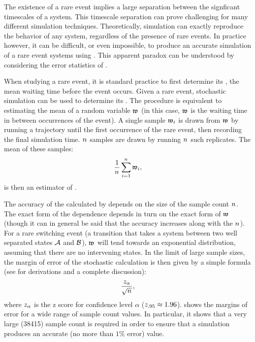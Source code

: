 The existence of a rare event implies a large separation between the signficant timescales of  a system. This timescale separation can prove challenging\cite{Shampine:1979em,Petzold:1983if} for many different simulation techniques. Theoretically,  simulation can exactly reproduce the behavior of any system, regardless of the presence of rare events. In practice however, it can be difficult, or even impossible, to produce an accurate simulation of a rare event systems using . This apparent paradox can be understood by considering the error statistics of . 


When studying a rare event, it is standard practice to first determine its , the mean waiting time before the event occurs. Given a rare event, stochastic simulation can be used to determine its . The procedure is equivalent to estimating the mean of a random variable $\mathfrak{w}_{}$ (in this case, $\mathfrak{w}_{}$ is the waiting time in between occurrences of the event). A single sample $\mathfrak{w}_{i}$ is drawn from $\mathfrak{w}_{}$ by running a trajectory until the first occurrence of the rare event, then recording the final simulation time. $n_{}$ samples are drawn by running $n_{}$ such replicates. The mean of these samples: 
\begin{equation*}
    \frac{1}{n_{}} \sum_{i=1}^{n_{}} \mathfrak{w}_{i}, 
\end{equation*}
is then an estimator of .

The accuracy of the  calculated by  depends on the size of the sample count $n_{}$. The exact form of the dependence depends in turn on the exact form of $\mathfrak{w}_{}$ (though it can in general be said that the accuracy increases along with the $n_{}$). For a rare switching event (\eg a transition that takes a system between two well separated states $\mathcal{A}$ and $\mathcal{B}$), $\mathfrak{w}_{}$ will tend towards an exponential distribution{\cite{Aldous:1982ev}}, assuming that there are no intervening states. In the limit of large sample sizes, the margin of error of the stochastic  calculation is then given by a simple formula (see  for derivations and a complete discussion):
\begin{equation*}
    \frac{z_{\alpha}}{\sqrt{n_{}}},
\end{equation*}
where $z_{\alpha}$ is the z score for confidence level $\alpha$ (\ie $z_{.95} \approx 1.96$).  shows the margins of error for a wide range of sample count values. In particular, it shows that a very large (38415) sample count is required in order to ensure that a simulation produces an accurate (\ie no more than $1\%$ error)  value.

